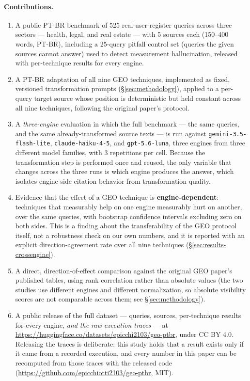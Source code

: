 \documentclass[11pt,a4paper]{article}
\begin{document}
\paragraph{Contributions.}
\begin{enumerate}[nosep]
  \item A public PT-BR benchmark of 525 real-user-register queries across
    three sectors --- health, legal, and real estate --- with 5 sources each
    (150--400 words, PT-BR), including a 25-query pitfall control set
    (queries the given sources cannot answer) used to detect measurement
    hallucination, released with per-technique results for every engine.
  \item A PT-BR adaptation of all nine GEO techniques, implemented as fixed,
    versioned transformation prompts (\S\ref{sec:methodology}), applied to a
    per-query target source whose position is deterministic but held
    constant across all nine techniques, following the original paper's
    protocol.
  \item A \emph{three-engine} evaluation in which the full benchmark --- the
    same queries, and the same already-transformed source texts --- is run
    against \texttt{gemini-3.5-flash-lite}, \texttt{claude-haiku-4-5}, and
    \texttt{gpt-5.6-luna}, three engines from three different model
    families, with 3 repetitions per cell. Because the transformation step
    is performed once and reused, the only variable that changes across the
    three runs is which engine produces the answer, which isolates
    engine-side citation behavior from transformation quality.
  \item Evidence that the effect of a GEO technique is
    \textbf{engine-dependent}: techniques that measurably help on one engine
    measurably hurt on another, over the same queries, with bootstrap
    confidence intervals excluding zero on both sides. This is a finding
    about the transferability of the GEO protocol itself, not a robustness
    check on our own numbers, and it is reported with an explicit
    direction-agreement rate over all nine techniques
    (\S\ref{sec:results-crossengine}).
  \item A direct, direction-of-effect comparison against the original GEO
    paper's published tables, using rank correlation rather than absolute
    values (the two studies use different engines and different
    normalization, so absolute visibility scores are not comparable across
    them; see \S\ref{sec:methodology}).
  \item A public release of the full dataset --- queries, sources,
    per-technique results for every engine, \emph{and the raw execution
    traces} --- at
    \url{https://huggingface.co/datasets/epicchi2103/geo-ptbr}, under CC BY
    4.0. Releasing the traces is deliberate: this study holds that a result
    exists only if it came from a recorded execution, and every number in
    this paper can be recomputed from those traces with the released code
    (\url{https://github.com/epicchiotti2103/geo-ptbr}, MIT).
\end{enumerate}
\end{document}
